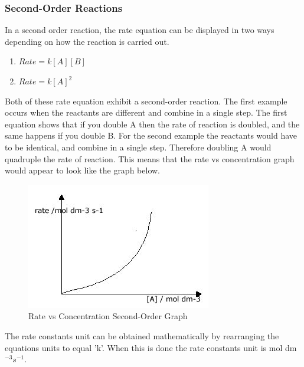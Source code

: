 \subsubsection{Second-Order Reactions}

In a second order reaction, the rate equation can be displayed in two ways depending on how the reaction is carried out.

\begin{enumerate}
\item $Rate = k[A] [B]$
\item $Rate = k[A]^2$
\end{enumerate}

Both of these rate equation exhibit a second-order reaction. The first example occurs when the reactants are different and combine in a single step. The first equation shows that if you double A then the rate of reaction is doubled, and the same happens if you double B. For the second example the reactants would have to be identical, and combine in a single step. Therefore doubling A would quadruple the rate of reaction. This means that the rate vs concentration graph would appear to look like the graph below.

\begin{figure}[H]
    \includegraphics[width=\textwidth]{./Planning/Images/SecondOrder.jpg}
    \caption{ Rate vs Concentration Second-Order Graph} \label{fig:Second Order Graph}
\end{figure}

The rate constants unit can be obtained mathematically by rearranging the equations units to equal 'k'. When this is done the rate constants unit is mol dm$^{-3} s^{-1}$.







